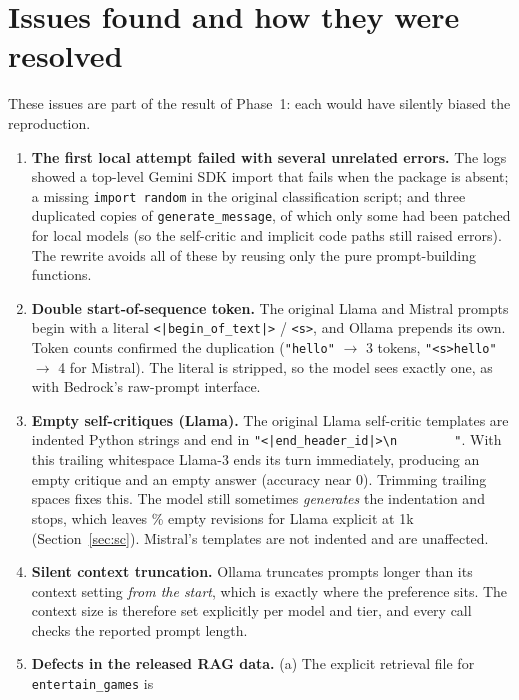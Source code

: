 \documentclass[11pt,a4paper]{article}
\begin{document}
\section{Issues found and how they were resolved}\label{sec:issues}

These issues are part of the result of Phase~1: each would have silently biased the reproduction.

\begin{enumerate}
\item \textbf{The first local attempt failed with several unrelated errors.} The logs showed a top-level Gemini SDK import that fails when
      the package is absent; a missing \texttt{import random} in the original classification script; and three duplicated
      copies of \texttt{generate\_message}, of which only some had been patched for local models (so the self-critic and implicit
      code paths still raised errors). The rewrite avoids all of these by reusing only the pure prompt-building functions.
\item \textbf{Double start-of-sequence token.} The original Llama and Mistral prompts begin with a literal
      \texttt{<|begin\_of\_text|>} / \texttt{<s>}, and Ollama prepends its own. Token counts confirmed the duplication
      (\texttt{"hello"} $\rightarrow$ 3 tokens, \texttt{"<s>hello"} $\rightarrow$ 4 for Mistral). The literal is stripped, so the
      model sees exactly one, as with Bedrock's raw-prompt interface.
\item \textbf{Empty self-critiques (Llama).} The original Llama self-critic templates are indented Python strings and end in
      \texttt{"<|end\_header\_id|>\textbackslash n~~~~~~~~"}. With this trailing whitespace Llama-3 ends its turn immediately,
      producing an empty critique and an empty answer (accuracy near 0). Trimming trailing spaces fixes this. The model
      still sometimes \emph{generates} the indentation and stops, which leaves \llamaSCemptyOneK\% empty revisions for Llama explicit at
      1k (Section~\ref{sec:sc}). Mistral's templates are not indented and are unaffected.
\item \textbf{Silent context truncation.} Ollama truncates prompts longer than its context setting \emph{from the start},
      which is exactly where the preference sits. The context size is therefore set explicitly per model and tier, and every call
      checks the reported prompt length.
\item \textbf{Defects in the released RAG data.} (a) The explicit retrieval file for \texttt{entertain\_games} is

\end{enumerate}
\end{document}
